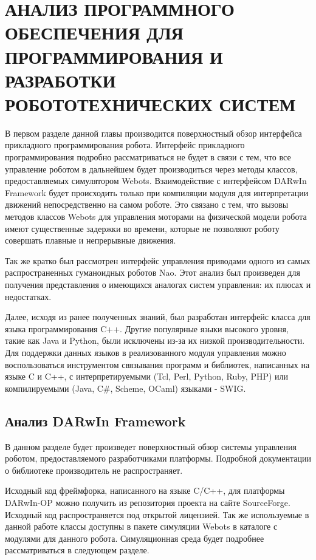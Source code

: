\chapter{АНАЛИЗ ПРОГРАММНОГО ОБЕСПЕЧЕНИЯ ДЛЯ ПРОГРАММИРОВАНИЯ И РАЗРАБОТКИ РОБОТОТЕХНИЧЕСКИХ СИСТЕМ}

В первом разделе данной главы производится поверхностный обзор интерфейса прикладного программирования робота. Интерфейс прикладного программирования подробно рассматриваться не будет в связи с тем, что все управление роботом в дальнейшем будет производиться через методы классов, предоставляемых симулятором Webots. Взаимодействие с интерфейсом DARwIn Framework будет происходить только при компиляции модуля для интерпретации движений непосредственно на самом роботе. Это связано с тем, что вызовы методов классов Webots для управления моторами на физической модели робота имеют существенные задержки во времени, которые не позволяют роботу совершать плавные и непрерывные движения.

Так же кратко был рассмотрен интерфейс управления приводами одного из самых распространенных гуманоидных роботов Nao. Этот анализ был произведен для получения представления о имеющихся аналогах систем управления: их плюсах и недостатках.

Далее, исходя из ранее полученных знаний, был разработан интерфейс класса для языка программирования C++. Другие популярные языки высокого уровня, такие как Java и Python, были исключены из-за их низкой производительности. Для поддержки данных языков в реализованного модуля управления можно воспользоваться инструментом связывания программ и библиотек, написанных на языке C и C++, с интерпретируемыми (Tcl, Perl, Python, Ruby, PHP) или компилируемыми (Java, C\#, Scheme, OCaml) языками - SWIG\cite{beazley1997swig}.


\section{Анализ DARwIn Framework}

В данном разделе будет произведет поверхностный обзор системы управления роботом, предоставляемого разработчиками платформы. Подробной документации о библиотеке производитель не распространяет.

Исходный код фреймфорка, написанного на языке C/C++, для платформы DARwIn-OP можно получить из репозитория проекта на сайте SourceForge. Исходный код распространяется под открытой лицензией. Так же используемые в данной работе классы доступны в пакете симуляции Webots в каталоге с модулями для данного робота. Симуляционная среда будет подробнее рассматриваться в следующем разделе.

